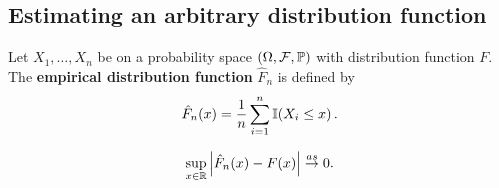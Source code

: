 \subsection{Estimating an arbitrary distribution function}
\label{sec:estim-an-arbitr}

Let $X_{1}, \dots, X_{n}$ be \iid on a probability space $(\Omega,
\mathcal{F}, \Prob)$ with distribution function $F$.  The
\textbf{empirical distribution function} $\hat F_{n}$ is defined by
\begin{equation}
  \label{eq:1}
  \hat F_{n}(x) = \frac{1}{n} \sum_{i=1}^{n} \I{X_{i} \leq x}.
\end{equation}


\begin{thm}
  \label{defn:Introduction:2}
  \begin{equation}
    \label{eq:2}
    \sup_{x \in \mathbb{R}} \left| \hat F_{n}(x) - F(x) \right| \overset{as}{\rightarrow} 0.
  \end{equation}
\end{thm}


